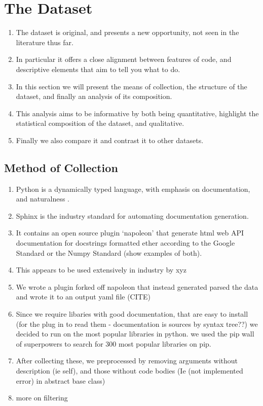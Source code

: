 \chapter{The Dataset}
\label{the_dataset}

\begin{enumerate}
    \item The dataset is original, and presents a new opportunity, not seen in the literature thus far.
    \item In particular it offers a close alignment between features of code, and descriptive elements that aim to tell you what to do.
    \item In this section we will present the means of collection, the structure of the dataset, and finally an analysis of its composition. 
    \item This analysis aims to be informative by both being quantitative, highlight the statistical composition of the dataset, and qualitative.
    \item Finally we  also compare it and contrast it to other datasets.
\end{enumerate}



\section{Method of Collection} %
\label{sec:method_of_collection}

\begin{enumerate}
    \item Python is a dynamically typed language, with emphasis on documentation, and naturalness .
    \item Sphinx is the industry standard for automating documentation generation.
    \item It contains an open source plugin `napoleon' that generate html web API documentation for docstrings formatted ether according to the Google Standard or the Numpy Standard (show examples of both).
    \item This appears to be used extensively in industry by xyz
    \item We wrote a plugin forked off napoleon that instead generated parsed the data and wrote it to an output yaml file (CITE)
    \item Since we require libaries with good documentation, that are easy to install (for the plug in to read them - documentation is sources by syntax tree??) we decided to run on the most popular libraries in python. we used the pip wall of superpowers to search for 300 most popular libraries on pip.
    \item After collecting these, we preprocessed by removing arguments without description (ie self), and those without code bodies (Ie (not implemented error) in abstract base class)
    \item more on filtering
\end{enumerate}

